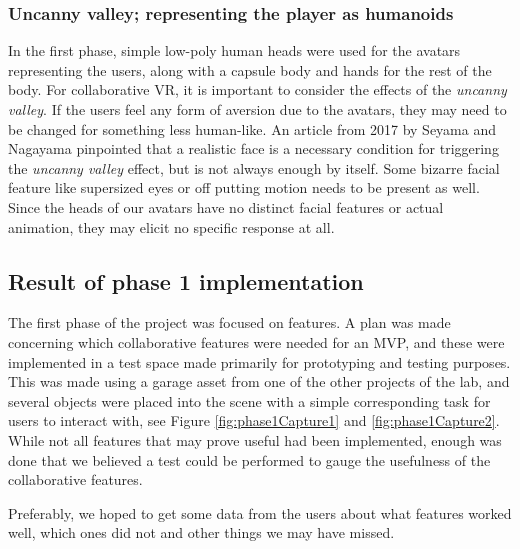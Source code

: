 \subsubsection{Uncanny valley; representing the player as humanoids}
In the first phase, simple low-poly human heads were used for the avatars representing the users, along with a capsule body and hands for the rest of the body. For collaborative VR, it is important to consider the effects of the \textit{uncanny valley}\cite{mori2012uncanny}. If the users feel any form of aversion due to the avatars, they may need to be changed for something less human-like. An article from 2017 by Seyama and Nagayama \cite{seyama2007uncanny} pinpointed that a realistic face is a necessary condition for triggering the \textit{uncanny valley} effect, but is not always enough by itself. Some bizarre facial feature like supersized eyes or off putting motion needs to be present as well. Since the heads of our avatars have no distinct facial features or actual animation, they may elicit no specific response at all.

\subsection{Result of phase 1 implementation}
The first phase of the project was focused on features. A plan was made concerning which collaborative features were needed for an MVP, and these were implemented in a test space made primarily for prototyping and testing purposes. This was made using a garage asset from one of the other projects of the lab, and several objects were placed into the scene with a simple corresponding task for users to interact with, see Figure \ref{fig:phase1Capture1} and \ref{fig:phase1Capture2}. While not all features that may prove useful had been implemented, enough was done that we believed a test could be performed to gauge the usefulness of the collaborative features. 

Preferably, we hoped to get some data from the users about what features worked well, which ones did not and other things we may have missed.


